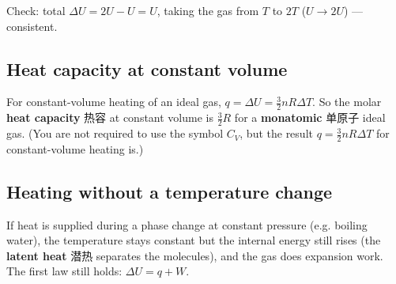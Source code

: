 \documentclass[11pt]{article}
\begin{document}
Check: total $\Delta U = 2U - U = U$, taking the gas from $T$ to $2T$ ($U \to 2U$) — consistent.

\subsection*{Heat capacity at constant volume}

For constant-volume heating of an ideal gas, $q = \Delta U = \tfrac{3}{2} n R \Delta T$. So the molar \textbf{heat capacity} 热容 at constant volume is $\tfrac{3}{2} R$ for a \textbf{monatomic} 单原子 ideal gas. (You are not required to use the symbol $C_V$, but the result $q = \tfrac{3}{2} n R \Delta T$ for constant-volume heating is.)

\subsection*{Heating without a temperature change}

If heat is supplied during a phase change at constant pressure (e.g. boiling water), the temperature stays constant but the internal energy still rises (the \textbf{latent heat} 潜热 separates the molecules), and the gas does expansion work. The first law still holds: $\Delta U = q + W$.
\end{document}
